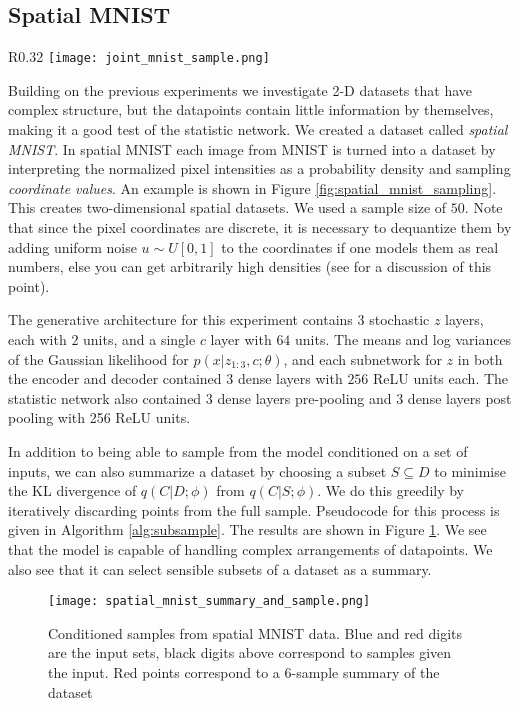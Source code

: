 \documentclass{article} \usepackage{iclr2017_conference,times}
\begin{document}
\subsection{Spatial MNIST}
\begin{wrapfigure}{R}{0.32\linewidth}
\centering
\texttt{[image: joint\_mnist\_sample.png]}
\caption{An \emph{image} from MNIST on the left, transformed to a \emph{set} of  $50$ $(x,y)$ coordinates, shown as a scatter plot on the right. \label{fig:spatial_mnist_sampling}}

\end{wrapfigure}
Building on the previous experiments we investigate 2-D datasets that have complex structure, but the datapoints contain little information by themselves, making it a good test of the statistic network. We created a dataset called \emph{spatial MNIST}. In spatial MNIST each image from MNIST \citep{mnist} is turned into a dataset by interpreting the normalized pixel intensities as a probability density and sampling \emph{coordinate values}. An example is shown in Figure \ref{fig:spatial_mnist_sampling}. This creates two-dimensional spatial datasets. We used a sample size of $50$. Note that since the pixel coordinates are discrete, it is necessary to dequantize them by adding uniform noise $u \sim U[0,1]$ to the coordinates if one models them as real numbers, else you can get arbitrarily high densities (see \citet{note_evaluation_generative} for a discussion of this point).

The generative architecture for this experiment contains $3$ stochastic $z$ layers, each with $2$ units, and a single $c$ layer with $64$ units. The means and log variances of the Gaussian likelihood for $p(x|z_{1:3},c ;\theta)$, and each subnetwork for $z$ in both the encoder and decoder contained $3$ dense layers with $256$ ReLU units each. The statistic network also contained 3 dense layers pre-pooling and 3 dense layers post pooling with 256 ReLU units.

In addition to being able to sample from the model conditioned on a set of inputs, we can also summarize a dataset by choosing a subset $S \subseteq D$ to minimise the KL divergence of $q(C | D ;\phi)$ from $q(C | S; \phi)$. We do this greedily by iteratively discarding points from the full sample. Pseudocode for this process is given in Algorithm \ref{alg:subsample}.
The results are shown in Figure \ref{fig:spatial_mnist_examples}. We see that the model is capable of handling complex arrangements of datapoints. We also see that it can select sensible subsets of a dataset as a summary. 
\begin{figure}
\centering
\texttt{[image: spatial\_mnist\_summary\_and\_sample.png]}
\vspace{-1.5em}
\caption{Conditioned samples from spatial MNIST data. Blue and red digits are the input sets, black digits above correspond to samples given the input. Red points correspond to a $6$-sample summary of the dataset \label{fig:spatial_mnist_examples}}
\end{figure}
\end{document}
